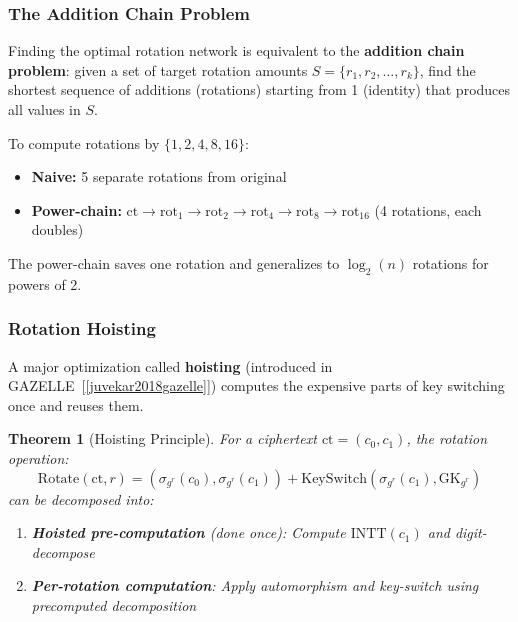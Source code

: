 \documentclass[11pt,a4paper]{article}
\newtheorem{theorem}{Theorem}
\begin{document}
\subsubsection{The Addition Chain Problem}

Finding the optimal rotation network is equivalent to the \textbf{addition chain problem}: given a set of target rotation amounts $S = \{r_1, r_2, \ldots, r_k\}$, find the shortest sequence of additions (rotations) starting from 1 (identity) that produces all values in $S$.

\begin{example}
To compute rotations by $\{1, 2, 4, 8, 16\}$:
\begin{itemize}
    \item \textbf{Naive:} 5 separate rotations from original
    \item \textbf{Power-chain:} $\text{ct} \to \text{rot}_1 \to \text{rot}_2 \to \text{rot}_4 \to \text{rot}_8 \to \text{rot}_{16}$ (4 rotations, each doubles)
\end{itemize}

\begin{center}
\begin{tikzpicture}[scale=0.8]
\end{tikzpicture}
\end{center}

The power-chain saves one rotation and generalizes to $\log_2(n)$ rotations for powers of 2.
\end{example}

\subsubsection{Rotation Hoisting}

A major optimization called \textbf{hoisting} (introduced in GAZELLE~[\ref{juvekar2018gazelle}]) computes the expensive parts of key switching once and reuses them.

\begin{theorem}[Hoisting Principle]
For a ciphertext $\text{ct} = (c_0, c_1)$, the rotation operation:
\[
\text{Rotate}(\text{ct}, r) = (\sigma_{g^r}(c_0), \sigma_{g^r}(c_1)) + \text{KeySwitch}(\sigma_{g^r}(c_1), \text{GK}_{g^r})
\]
can be decomposed into:
\begin{enumerate}
    \item \textbf{Hoisted pre-computation} (done once): Compute $\text{INTT}(c_1)$ and digit-decompose
    \item \textbf{Per-rotation computation}: Apply automorphism and key-switch using precomputed decomposition
\end{enumerate}
\end{theorem}
\end{document}
